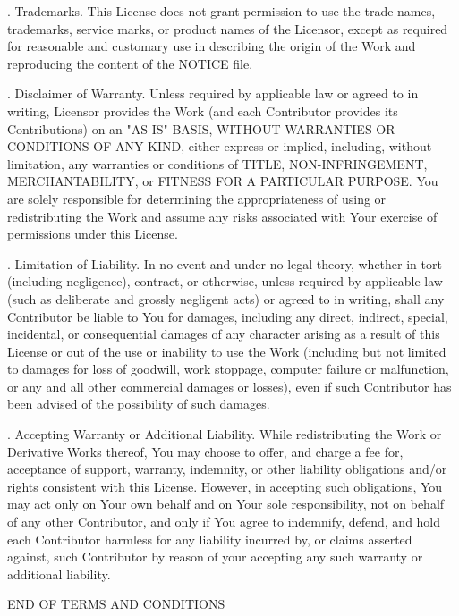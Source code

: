 \bigskip
{}. Trademarks. This License does not grant permission to use the trade names, trademarks, service marks, or product names of the Licensor, except as required for reasonable and customary use in describing the origin of the Work and reproducing the content of the NOTICE file.

\bigskip
{}. Disclaimer of Warranty. Unless required by applicable law or agreed to in writing, Licensor provides the Work (and each Contributor provides its Contributions) on an "AS IS" BASIS, WITHOUT WARRANTIES OR CONDITIONS OF ANY KIND, either express or implied, including, without limitation, any warranties or conditions of TITLE, NON-INFRINGEMENT, MERCHANTABILITY, or FITNESS FOR A PARTICULAR PURPOSE. You are solely responsible for determining the appropriateness of using or redistributing the Work and assume any risks associated with Your exercise of permissions under this License.

\bigskip
{}. Limitation of Liability. In no event and under no legal theory, whether in tort (including negligence), contract, or otherwise, unless required by applicable law (such as deliberate and grossly negligent acts) or agreed to in writing, shall any Contributor be liable to You for damages, including any direct, indirect, special, incidental, or consequential damages of any character arising as a result of this License or out of the use or inability to use the Work (including but not limited to damages for loss of goodwill, work stoppage, computer failure or malfunction, or any and all other commercial damages or losses), even if such Contributor has been advised of the possibility of such damages.

\bigskip
{}. Accepting Warranty or Additional Liability. While redistributing the Work or Derivative Works thereof, You may choose to offer, and charge a fee for, acceptance of support, warranty, indemnity, or other liability obligations and/or rights consistent with this License. However, in accepting such obligations, You may act only on Your own behalf and on Your sole responsibility, not on behalf of any other Contributor, and only if You agree to indemnify, defend, and hold each Contributor harmless for any liability incurred by, or claims asserted against, such Contributor by reason of your accepting any such warranty or additional liability.

\bigskip
\noindent END OF TERMS AND CONDITIONS